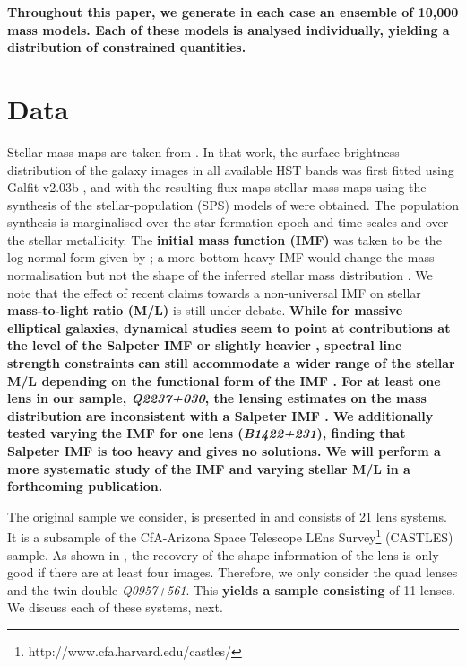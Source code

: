 \documentclass[useAMS,usenatbib]{mn2e}
\def\Glass{{\sc Glass}}
\newcommand{\cb}[1]{{\color{red} \textbf{#1}}}
\begin{document}
\cb{Throughout this paper, we generate in each case an ensemble of 10,000 mass models. Each of these models is analysed individually, yielding a distribution of constrained quantities.}


\section{Data}\label{sec:data}
Stellar mass maps are taken from \cite{2011ApJ...740...97L}. In that work, the surface brightness distribution of the galaxy images in all available HST bands was first fitted using {\sc Galfit v2.03b} \citep{2002AJ....124..266P}, and with the resulting flux maps stellar mass maps using the synthesis of the stellar-population (SPS) models of \cite{2003MNRAS.344.1000B} were obtained. The population synthesis is marginalised over the star formation epoch and time scales and over the stellar metallicity. The \cb{initial mass function (IMF)} was taken to be the log-normal form given by \cite{2003PASP..115..763C}; a more bottom-heavy IMF would change the mass normalisation \citep[cf.][]{2014ApJ...793...96S} but not the shape of the inferred stellar mass distribution \citep[unless the IMF presents significant intrinsic deviations locally, see e.g.][]{2015MNRAS.447.1033M}. We note that the effect of recent claims towards a non-universal IMF on stellar \cb{mass-to-light ratio (M/L)} is still under debate. \cb{While for massive elliptical galaxies, dynamical studies seem to point at contributions at the level of the Salpeter IMF or slightly heavier \citep{2013MNRAS.432.1862C}, spectral line strength constraints can still accommodate a wider range of the stellar M/L depending on the functional form of the IMF \citep{2013MNRAS.429L..15F}. For at least one lens in our sample, \textit{Q2237+030}, the lensing estimates on the mass distribution are inconsistent with a Salpeter IMF \citep{2010MNRAS.409L..30F}. We additionally tested varying the IMF for one lens ({\it B1422+231}), finding that Salpeter IMF is too heavy and gives no solutions. We will perform a more systematic study of the IMF and varying stellar M/L in a forthcoming publication.}

The original sample we consider, is presented in \cite{2011ApJ...740...97L} and consists of 21 lens systems. It is a subsample of the CfA-Arizona Space Telescope LEns Survey\footnote{http://www.cfa.harvard.edu/castles/} (CASTLES) sample. As shown in \citep{2014arXiv1401.7990C}, the recovery of the shape information of the lens is only good if there are at least four images. Therefore, we only consider the quad lenses and the twin double \textit{Q0957+561}. This \cb{yields a sample consisting} of 11 lenses. We discuss each of these systems, next.
\end{document}

